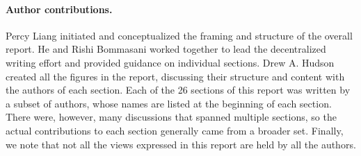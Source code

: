 \paragraph{Author contributions.}

Percy Liang initiated and conceptualized the framing and structure of the overall report.
He and Rishi Bommasani worked together to lead the decentralized writing effort
and provided guidance on individual sections.
Drew A. Hudson created all the figures in the report, discussing
their structure and content with the authors of each section.
Each of the 26 sections of this report was written
by a subset of authors, whose names are listed at the beginning of each section.
There were, however, many discussions that spanned multiple sections,
so the actual contributions to each section generally came from a broader set.
Finally, we note that not all the views expressed in this report are held
by all the authors.



%
